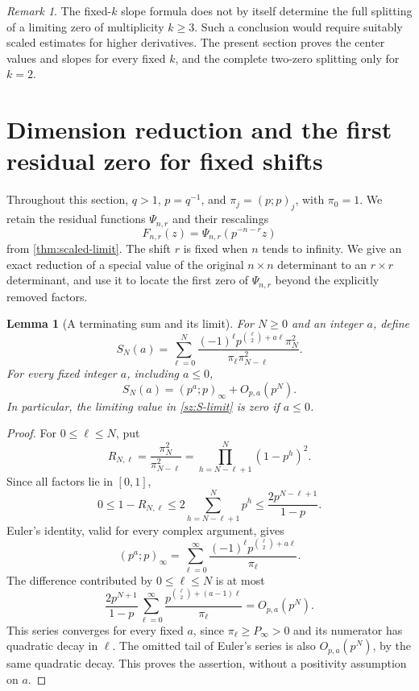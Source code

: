 \documentclass[11pt]{article}
\numberwithin{equation}{section}
\newtheorem{lemma}[lemma]{Lemma}
\theoremstyle{definition}
\theoremstyle{remark}
\newtheorem{remark}[remark]{Remark}
\begin{document}
\begin{remark}\label{mx:scope}
The fixed-$k$ slope formula does not by itself determine the full
splitting of a limiting zero of multiplicity $k\ge3$.
Such a conclusion would require suitably scaled estimates for
higher derivatives.  The present section proves the center values
and slopes for every fixed $k$, and the complete two-zero splitting
only for $k=2$.
\end{remark}


\section{Dimension reduction and the first residual zero for fixed shifts}
\label{sz:section}

Throughout this section, $q>1$, $p=q^{-1}$, and
$\pi_j=(p;p)_j$, with $\pi_0=1$.  We retain the residual functions
$\Psi_{n,r}$ and their rescalings
\[
 F_{n,r}(z)=\Psi_{n,r}(p^{-n-r}z)
\]
from \cref{thm:scaled-limit}.  The shift $r$ is fixed when $n$ tends to
infinity.  We give an exact reduction of a special value of the original
$n\times n$ determinant to an $r\times r$ determinant, and use it to locate
the first zero of $\Psi_{n,r}$ beyond the explicitly removed factors.

\begin{lemma}[A terminating sum and its limit]\label{sz:sum-limit}
For $N\ge0$ and an integer $a$, define
\begin{equation}\label{sz:def-S}
 S_N(a)=\sum_{\ell=0}^{N}
 \frac{(-1)^\ell p^{\binom{\ell}{2}+a\ell}\pi_N^2}
 {\pi_\ell\pi_{N-\ell}^2}.
\end{equation}
For every fixed integer $a$, including $a\le0$,
\begin{equation}\label{sz:S-limit}
 S_N(a)=(p^a;p)_\infty+O_{p,a}(p^N).
\end{equation}
In particular, the limiting value in \eqref{sz:S-limit} is zero if $a\le0$.
\end{lemma}

\begin{proof}
For $0\le\ell\le N$, put
\[
 R_{N,\ell}=\frac{\pi_N^2}{\pi_{N-\ell}^2}
 =\prod_{h=N-\ell+1}^{N}(1-p^h)^2.
\]
Since all factors lie in $[0,1]$,
\begin{equation}\label{sz:ratio-estimate}
 0\le 1-R_{N,\ell}
 \le 2\sum_{h=N-\ell+1}^{N}p^h
 \le\frac{2p^{N-\ell+1}}{1-p}.
\end{equation}
Euler's identity, valid for every complex argument, gives
\[
 (p^a;p)_\infty
 =\sum_{\ell=0}^{\infty}
 \frac{(-1)^\ell p^{\binom{\ell}{2}+a\ell}}{\pi_\ell}.
\]
The difference contributed by $0\le\ell\le N$ is at most
\[
 \frac{2p^{N+1}}{1-p}
 \sum_{\ell=0}^{\infty}
 \frac{p^{\binom{\ell}{2}+(a-1)\ell}}{\pi_\ell}
 =O_{p,a}(p^N).
\]
This series converges for every fixed $a$, since
$\pi_\ell\ge P_\infty>0$ and its numerator has quadratic decay in
$\ell$.  The omitted tail of Euler's series is also $O_{p,a}(p^N)$,
by the same quadratic decay.  This proves the assertion, without a
positivity assumption on $a$.
\end{proof}
\end{document}
